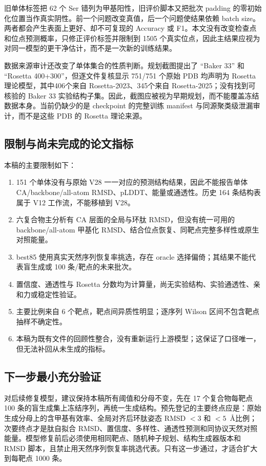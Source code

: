 旧单体标签把 62 个 Ser 错列为甲基阳性，旧评价脚本又把批次 padding 的零初始化位置当作真实阴性。前一个问题改变真值，后一个问题使结果依赖 batch size。两者都会产生表面上更好、却不可复现的 Accuracy 或 F1。本文没有改变检查点和位点预测概率，只修正评价标签并限制到 1505 个真实位点，因此主结果应视为对同一模型的更干净估计，而不是一次新的训练结果。

数据来源审计还改变了单体集合的性质判断。规划截图提出了 ``Baker 33'' 和 ``Rosetta 400+300''，但逐文件复核显示 751/751 个原始 PDB 均声明为 Rosetta 理论模型，其中406个来自 Rosetta-2023、345个来自 Rosetta-2025；没有找到可核验的 Baker 33 实验结构子集。因此，截图应被视为早期规划，而不能覆盖冻结数据本身。当前仍缺少的是 checkpoint 的完整训练 manifest 与同源聚类级泄漏审计，而不是这些 PDB 的 Rosetta 理论来源。

\subsection{限制与尚未完成的论文指标}

本稿的主要限制如下：

\begin{enumerate}
  \item 151 个单体没有与原始 V28 一一对应的预测结构结果，因此不能报告单体 CA/backbone/all-atom RMSD、pLDDT、能量或通透性。历史 164 条结构表属于 V12 工作流，不能移植到 V28。
  \item 六复合物主分析有 CA 层面的全局与环肽 RMSD，但没有统一可用的 backbone/all-atom 甲基化 RMSD、结合位点恢复、同靶点完整多样性或原生对照能量。
  \item best85 使用真实天然序列恢复率挑选，存在 oracle 选择偏倚；其结果不能代表盲生成或 100 条/靶点的未来批次。
  \item 置信度、通透性与 Rosetta 分数均为计算量，尚无实验结构、实验通透性、亲和力或稳定性验证。
  \item 主要比例来自 6 个靶点，靶点间异质性明显；逐序列 Wilson 区间不包含靶点抽样不确定性。
  \item 本稿为既有文件的回顾性整合，没有重新运行上游模型；这保证了口径唯一，但无法补回从未生成的指标。
\end{enumerate}

\subsection{下一步最小充分验证}

对后续修复模型，建议保持本稿所有阈值和分母不变，先在 17 个复合物每靶点 100 条的盲生成集上冻结序列，再统一生成结构。预先登记的主要终点应是：原始生成分母上的含甲基有效率、全局对齐后环肽姿态 RMSD $<3$ 和 $<5$~\AA 比例；次要终点才是肽自拟合 RMSD、置信度、多样性、通透性预测和同协议天然对照能量。模型修复前后必须使用相同靶点、随机种子规划、结构生成器版本和 RMSD 脚本，且禁止用天然序列恢复率挑选代表。只有这一步通过，才适合扩大到每靶点 1000 条。
